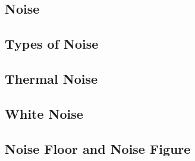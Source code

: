 \begin{refsection}
\section{Noise}

\subsection{Types of Noise}

\subsection{Thermal Noise}

\subsection{White Noise}

\subsection{Noise Floor and Noise Figure}

{}
\printbibliography[heading=subbibliography]
\end{refsection}

